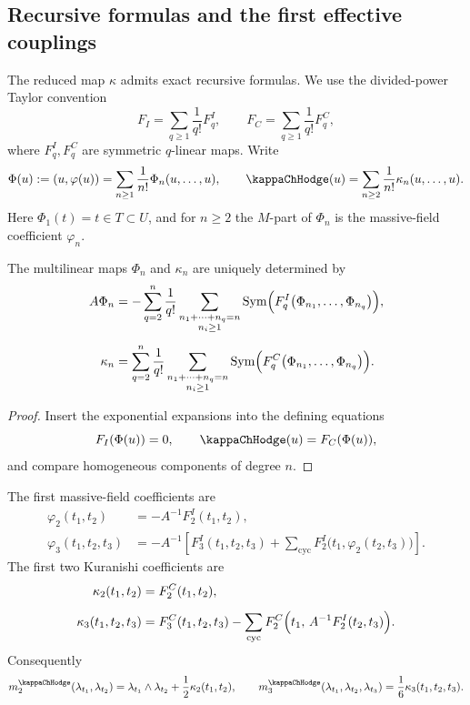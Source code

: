 \subsection{Recursive formulas and the first effective couplings}

The reduced map $\kappa$ admits exact recursive formulas.  We use the
divided-power Taylor convention
\[
F_I=\sum_{q\ge 1}\frac{1}{q!}F_q^I,
\qquad
F_C=\sum_{q\ge 1}\frac{1}{q!}F_q^C,
\]
where \(F_q^I,F_q^C\) are symmetric \(q\)-linear maps.  Write
\[
\Phi(u):=(u,\varphi(u))=\sum_{n\ge 1}\frac{1}{n!}\Phi_n(u,\dots,u),
\qquad
\kappaChHodge(u)=\sum_{n\ge 2}\frac{1}{n!}\kappa_n(u,\dots,u).
\]
Here \(\Phi_1(t)=t\in T\subset U\), and for \(n\ge2\) the \(M\)-part of
\(\Phi_n\) is the massive-field coefficient \(\varphi_n\).

\begin{proposition}%
The multilinear maps $\Phi_n$ and $\kappa_n$ are uniquely determined by
\begin{align}
A\Phi_n
&=
-
\sum_{q=2}^{n}
\frac{1}{q!}
\sum_{\substack{n_1+\cdots+n_q=n\\ n_i\ge 1}}
\operatorname{Sym}\Bigl(F_q^I\bigl(\Phi_{n_1},\dots,\Phi_{n_q}\bigr)\Bigr),
\\[0.5em]
\kappa_n
&=
\sum_{q=2}^{n}
\frac{1}{q!}
\sum_{\substack{n_1+\cdots+n_q=n\\ n_i\ge 1}}
\operatorname{Sym}\Bigl(F_q^C\bigl(\Phi_{n_1},\dots,\Phi_{n_q}\bigr)\Bigr).
\end{align}
\end{proposition}

\begin{proof}
Insert the exponential expansions into the defining equations
\[
F_I(\Phi(u))=0,
\qquad
\kappaChHodge(u)=F_C(\Phi(u)),
\]
and compare homogeneous components of degree $n$.
\end{proof}

\begin{corollary}%
The first massive-field coefficients are
\begin{align}
\varphi_2(t_1,t_2)
&=
-A^{-1}F_2^I(t_1,t_2),
\\[0.5em]
\varphi_3(t_1,t_2,t_3)
&=
-A^{-1}\left[
F_3^I(t_1,t_2,t_3)
+\sum_{\mathrm{cyc}}
F_2^I\bigl(t_1,\varphi_2(t_2,t_3)\bigr)
\right].
\end{align}
The first two Kuranishi coefficients are
\begin{align}
\kappa_2(t_1,t_2)
&=
F_2^C(t_1,t_2),
\\[0.5em]
\kappa_3(t_1,t_2,t_3)
&=
F_3^C(t_1,t_2,t_3)
-
\sum_{\mathrm{cyc}}
F_2^C\Bigl(t_1,\,A^{-1}F_2^I(t_2,t_3)\Bigr).
\end{align}
Consequently
\[
m_2^\kappaChHodge(\lambda_{t_1},\lambda_{t_2})
=
\lambda_{t_1}\wedge \lambda_{t_2}
+\frac{1}{2}\kappa_2(t_1,t_2),
\qquad
m_3^\kappaChHodge(\lambda_{t_1},\lambda_{t_2},\lambda_{t_3})
=
\frac{1}{6}\kappa_3(t_1,t_2,t_3).
\]
\end{corollary}

